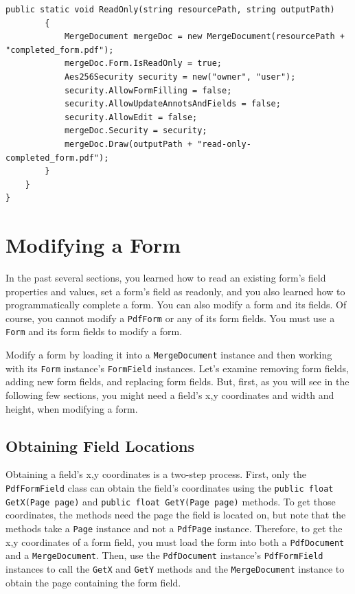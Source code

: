 \documentclass[american,letterpaper]{tufte-book}
\numberwithin{equation}{section}
\numberwithin{figure}{section}
\begin{document}
{{\begin{lstlisting}[caption={Setting a form as readonly.},label={lis:readonly-form},basicstyle={\small\ttfamily},breaklines=true]
        public static void ReadOnly(string resourcePath, string outputPath)
        {
            MergeDocument mergeDoc = new MergeDocument(resourcePath + "completed_form.pdf");
            mergeDoc.Form.IsReadOnly = true;
            Aes256Security security = new("owner", "user");
            security.AllowFormFilling = false;
            security.AllowUpdateAnnotsAndFields = false;
            security.AllowEdit = false;
            mergeDoc.Security = security;
            mergeDoc.Draw(outputPath + "read-only-completed_form.pdf");
        }
    }
}

\end{lstlisting}
\leavevmode\egroup

\section{Modifying a Form}

In the past several sections, you learned how to read an existing
form's field properties and values, set a form's field as readonly, and you also learned how to programmatically
complete a form. You can also modify a form and its fields. Of course,
you cannot modify a \texttt{PdfForm} or any of its form fields. You
must use a \texttt{Form} and its form fields to modify a form. 

Modify a form by loading it into a \texttt{MergeDocument} instance
and then working with its \texttt{Form} instance's \texttt{FormField}
instances. Let's examine removing form fields, adding new form fields,
and replacing form fields. But, first, as you will see in the following
few sections, you might need a field's x,y coordinates and width and
height, when modifying a form.

\subsection{Obtaining Field Locations}

Obtaining a field's x,y coordinates is a two-step process. First,
only the \texttt{PdfFormField} class can obtain the field's coordinates
using the \texttt{public float GetX(Page page)} and \texttt{public
float GetY(Page page)} methods. To get those coordinates, the methods
need the page the field is located on, but note that the methods take
a \texttt{Page} instance and not a \texttt{PdfPage} instance. Therefore,
to get the x,y coordinates of a form field, you must load the form
into both a \texttt{PdfDocument} and a \texttt{MergeDocument}. Then,
use the \texttt{PdfDocument} instance's \texttt{PdfFormField} instances
to call the \texttt{GetX} and \texttt{GetY} methods and the \texttt{MergeDocument}
instance to obtain the page containing the form field. 

}}
\end{document}
